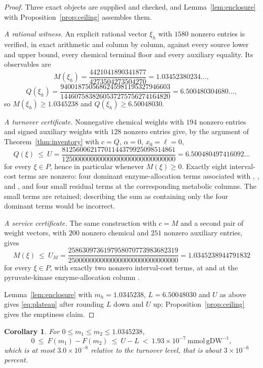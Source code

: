 \documentclass[11pt,a4paper]{article}
\theoremstyle{plain}
\newtheorem{corollary}[theorem]{Corollary}
\theoremstyle{definition}
\theoremstyle{remark}
\newcommand{\mmolg}{\mathrm{mmol}\,\mathrm{gDW}^{-1}}
\begin{document}
\begin{proof}
Three exact objects are supplied and checked, and Lemma~\ref{lem:enclosure}
with Proposition~\ref{prop:ceiling} assembles them.

\emph{A rational witness.} An explicit rational vector $\xi_h$ with $1580$
nonzero entries is verified, in exact arithmetic and column by column, against
every source lower and upper bound, every chemical terminal floor and every
auxiliary equality. Its observables are
\[
M(\xi_h)=\frac{4421041890341877}{4273504273504270}=1.03452380234\ldots,
\]
\[
Q(\xi_h)=\frac{9400187505686245981195327946603}
{1446075838260537275756274164820}=6.500480304680\ldots,
\]
so $M(\xi_h)\ge 1.0345238$ and $Q(\xi_h)\ge 6.50048030$.

\emph{A turnover certificate.} Nonnegative chemical weights with $194$ nonzero
entries and signed auxiliary weights with $128$ nonzero entries give, by the
argument of Theorem~\ref{thm:inventory} with $c=Q$, $\alpha=0$, $x_0=\ell=0$,
\[
Q(\xi)\ \le\ U=\frac{81256006217701144379925098514861}
{12500000000000000000000000000000}=6.500480497416092\ldots
\]
for every $\xi\in P$, hence in particular whenever $M(\xi)\ge0$. Exactly eight
interval-cost terms are nonzero: four dominant enzyme-allocation terms
associated with , ,  and , and
four small residual terms at the corresponding metabolic columns. The small
terms are retained; describing the sum as containing only the four dominant
terms would be incorrect.

\emph{A service certificate.} The same construction with $c=M$ and a second
pair of weight vectors, with $200$ nonzero chemical and $251$ nonzero auxiliary
entries, gives
\[
M(\xi)\ \le\ U_M=\frac{2586309736197958070773983682319}
{2500000000000000000000000000000}=1.0345238944791832
\]
for every $\xi\in P$, with exactly two nonzero interval-cost terms, at
 and at the pyruvate-kinase enzyme-allocation column
.

Lemma~\ref{lem:enclosure} with $m_h=1.0345238$, $L=6.50048030$ and $U$ as above
gives \eqref{eq:plateau} after rounding $L$ down and $U$ up;
Proposition~\ref{prop:ceiling} gives the emptiness claim.
\end{proof}

\begin{corollary}\label{cor:variation}
For $0\le m_1\le m_2\le 1.0345238$,
\[
0\ \le\ F(m_1)-F(m_2)\ \le\ U-L\ <\ 1.93\times10^{-7}\ \mmolg ,
\]
which is at most $3.0\times10^{-8}$ relative to the turnover level, that is
about $3\times10^{-6}$ percent.
\end{corollary}
\end{document}
